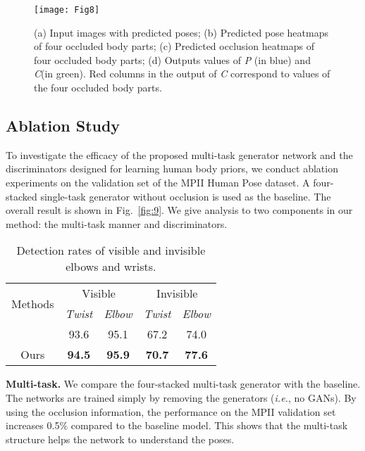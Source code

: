 \documentclass[10pt,letterpaper,twocolumn]{article}
\begin{document}
\begin{figure*}[h!]
\centering
\texttt{[image: Fig8]}
\caption{(a) Input images with predicted poses; (b) Predicted pose heatmaps of four occluded body parts; (c) Predicted occlusion heatmaps of four occluded body parts; (d) Outputs values of \textit{P} (in blue) and \textit{C}(in green). Red columns in the output of \textit{C} correspond to values of the four occluded body parts.}
\label{fig:Examples-inputs-and}
\end{figure*}

\subsection{Ablation Study}

To investigate the efficacy of the proposed multi-task generator network and the  discriminators designed for learning human body priors, we conduct ablation experiments on the validation set of the MPII Human Pose dataset. A four-stacked single-task generator without occlusion is used as the baseline. The overall result is shown in Fig.~\ref{fig:9}. We give analysis to two components in our method: the multi-task manner and discriminators.

\begin{table}[b!]
 \caption{Detection rates of visible and invisible elbows and wrists.} \label{tab:Detection-rates-of}
\small
 \centering
\renewcommand\arraystretch{1}
 \begin{tabular}{|c||cc|cc|}
  \hline
  \multirow{2}{*}{Methods} & \multicolumn{2}{c|}{Visible} & \multicolumn{2}{c|}{Invisible}\\
\cline{2-5} & \emph{Twist} & \emph{Elbow} & \emph{Twist} & \emph{Elbow} \\
  \hline
  \hline
 ~\cite{conf/eccv/NewellYD16} & 93.6  &  95.1  &  67.2  &  74.0 \\
  \hline
  Ours &  \textbf{94.5}  &  \textbf{95.9}   & \textbf{70.7}  &  \textbf{77.6}  \\
  \hline
 \end{tabular}
\end{table}

\textbf{Multi-task.} We compare the four-stacked multi-task generator with the baseline. The networks are trained simply by removing the generators (\emph{i.e.}, no GANs). By using the occlusion information, the performance on the MPII validation set increases 0.5\% compared to the baseline model. This shows that the multi-task structure helps the network to understand the poses.
\end{document}

